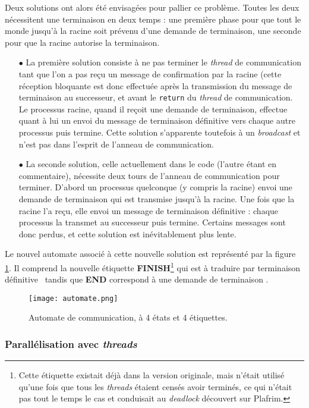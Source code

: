 Deux solutions ont alors été envisagées pour pallier ce problème. Toutes les deux nécessitent une terminaison en deux temps : une première phase pour que tout le monde jusqu'à la racine soit prévenu d'une demande de terminaison, une seconde pour que la racine autorise la terminaison. 
\begin{itemize}
\item[$\bullet$] La première solution consiste à ne pas terminer le \emph{thread} de communication tant que l'on a pas reçu un message de confirmation par la racine (cette réception bloquante est donc effectuée après la transmission du message de terminaison au successeur, et avant le \texttt{return} du \emph{thread} de communication. Le processus racine, quand il reçoit une demande de terminaison, effectue quant à lui un envoi du message de terminaison définitive vers chaque autre processus puis termine. Cette solution s'apparente toutefois à un \emph{broadcast} et n'est pas dans l'esprit de l'anneau de communication.
\item[$\bullet$] La seconde solution, celle actuellement dans le code (l'autre étant en commentaire), nécessite deux tours de l'anneau de communication pour terminer. D'abord un processus quelconque (y compris la racine) envoi une demande de terminaison qui est transmise jusqu'à la racine. Une fois que la racine l'a reçu, elle envoi un message de terminaison définitive : chaque processus la transmet au successeur puis termine. Certains messages sont donc perdus, et cette solution est inévitablement plus lente.
\end{itemize}

Le nouvel automate associé à cette nouvelle solution est représenté par la figure \ref{img:automate}. Il comprend la nouvelle étiquette \textbf{FINISH}\footnote{Cette étiquette existait déjà dans la version originale, mais n'était utilisé qu'une fois que tous les \emph{threads} étaient censés avoir terminés, ce qui n'était pas tout le temps le cas et conduisait au \emph{deadlock} découvert sur \textsf{Plafrim}.} qui est à traduire par \og terminaison définitive \fg~tandis que \textbf{END} correspond à une \og demande de terminaison \fg.

\begin{figure}
\raggedright
\texttt{[image: automate.png]}
\caption{Automate de communication, à 4 états et 4 étiquettes.}
\label{img:automate}
\end{figure}


\subsubsection*{Parallélisation avec \emph{threads}}

